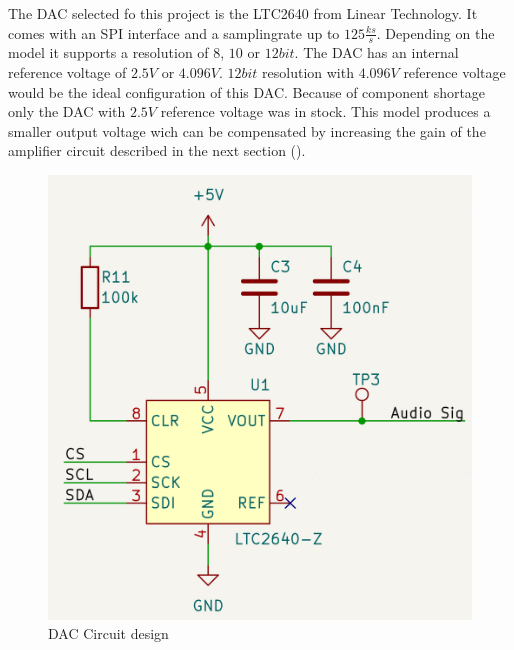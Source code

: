 %
The DAC selected fo this project is the LTC2640 from Linear Technology. It comes with an SPI interface and a samplingrate up to $125\frac{ks}{s}$. Depending on the model it supports a resolution of $8$, $10$ or $12bit$. The DAC has an internal reference voltage of $2.5V$ or $4.096V$. $12bit$ resolution with $4.096V$ reference voltage would be the ideal configuration of this DAC. Because of component shortage only the DAC with $2.5V$ reference voltage was in stock. This model produces a smaller output voltage wich can be compensated by increasing the gain of the amplifier circuit described in the next section ().\cite{linear_technology_ltc2640_2017}
%
\begin{figure}
  \centering
  \includegraphics[height=\mediumheight]{src/assets/pictures/circuit/dac_circuit.png}
  \caption{DAC Circuit design}\label{fig:pcb:dac_circuit}
\end{figure}